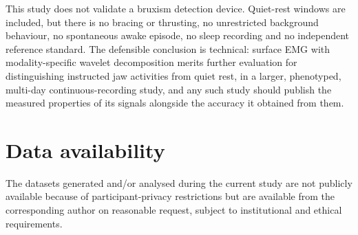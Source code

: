 \documentclass[pdflatex,sn-nature,iicol]{sn-jnl}
\begin{document}
This study does not validate a bruxism detection device. Quiet-rest windows are included, but there is no bracing or thrusting, no unrestricted background behaviour, no spontaneous awake episode, no sleep recording and no independent reference standard. The defensible conclusion is technical: surface EMG with modality-specific wavelet decomposition merits further evaluation for distinguishing instructed jaw activities from quiet rest, in a larger, phenotyped, multi-day continuous-recording study, and any such study should publish the measured properties of its signals alongside the accuracy it obtained from them.

\backmatter

\section*{Data availability}
The datasets generated and/or analysed during the current study are not publicly available because of participant-privacy restrictions but are available from the corresponding author on reasonable request, subject to institutional and ethical requirements.
\end{document}
